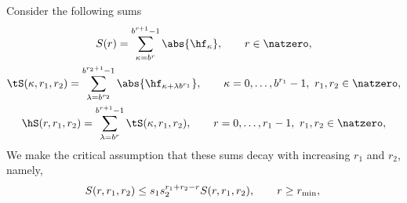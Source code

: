\documentclass[]{elsarticle}
\begin{document}
Consider the following sums
\begin{gather}
S(r) = \sum_{\kappa=b^{r}}^{b^{r+1}-1} \abs{\hf_{\kappa}}, \qquad r \in \natzero, \\
\tS(\kappa,r_1,r_2) = \sum_{\lambda=b^{r_2}}^{b^{r_2+1}-1} \abs{\hf_{\kappa+\lambda b^{r_1}}}, \qquad \kappa=0, \ldots, b^{r_1}-1, \ r_1,r_2 \in \natzero, \\
\hS(r,r_1,r_2) = \sum_{\lambda=b^{r}}^{b^{r+1}-1} \tS(\kappa,r_1,r_2), \qquad r=0, \ldots, r_1-1, \ r_1,r_2 \in \natzero,
\end{gather}
We make the critical assumption that these sums decay with increasing $r_1$ and $r_2$, namely, 
\begin{equation}
S(r,r_1,r_2) \le s_1 s_2^{r_1+r_2-r} S(r,r_1,r_2), \qquad r\ge r_{\min}, \\
\end{equation}




\end{document}
